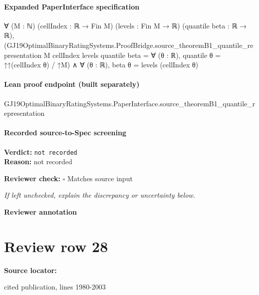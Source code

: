 \documentclass[10pt]{article}
\newcommand{\reviewerbox}{%
  \par\noindent\fbox{\parbox{0.96\linewidth}{\rule{0pt}{0.38in}}}\par
}
\newcommand{\reviewmatch}[1]{%
  \par\noindent\textbf{Reviewer check:} $\square$\; #1\par
  \noindent\emph{If left unchecked, explain the discrepancy or uncertainty below.}\par
}
\begin{document}
\paragraph{Expanded PaperInterface specification}
\begin{ReviewVerbatim}
∀ (M : ℕ) (cellIndex : ℝ → Fin M) (levels : Fin M → ℝ) (quantile beta : ℝ → ℝ),
  (GJ19OptimalBinaryRatingSystems.ProofBridge.source_theoremB1_quantile_representation M cellIndex levels quantile
        beta =
      ∀ (θ : ℝ), quantile θ = ↑↑(cellIndex θ) / ↑M) ∧
    ∀ (θ : ℝ), beta θ = levels (cellIndex θ)
\end{ReviewVerbatim}

\paragraph{Lean proof endpoint (built separately)}\begin{ReviewVerbatim}
GJ19OptimalBinaryRatingSystems.PaperInterface.source_theoremB1_quantile_representation
\end{ReviewVerbatim}

\paragraph{Recorded source-to-Spec screening}
\textbf{Verdict:} \texttt{not recorded}
\\
\textbf{Reason:} not recorded
\reviewmatch{Matches source input}
\noindent\textbf{Reviewer annotation}\par
\reviewerbox
\clearpage
\hypertarget{source-claim-5249ffde05e3b08f}{}
\section*{Review row 28}
\textbf{Source locator:} {\footnotesize\raggedright cited publication, lines 1980-\allowbreak{}2003\par}
\end{document}
